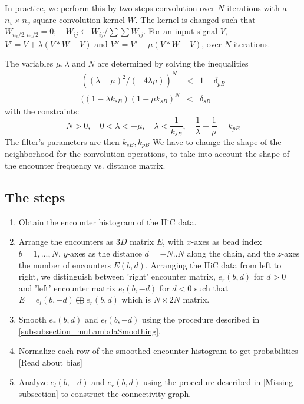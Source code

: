 \documentclass[12pt]{article}
\begin{document}
In practice, we perform this by two steps convolution over $N$ iterations with a $n_v\times n_v$ square convolution kernel $W$. The kernel is changed such that $W_{n_v/2,n_v/2} =0; \quad W_{ij}\leftarrow W_{ij}/\sum\sum W_{ij}$. For an input signal $V$, $V' = V+\lambda (V*W-V)$
and $V''= V'+\mu (V*W-V)$, over $N$ iterations. 

The variables $\mu,\lambda$ and $N$ are determined by solving the inequalities 
\begin{eqnarray*}
((\lambda-\mu)^2 /(-4\lambda\mu))^N &<& 1+\delta_{pB}\\
((1-\lambda k_{sB})(1-\mu k_{sB})^N &<& \delta_{sB}
\end{eqnarray*}
with the constraints:
\begin{equation*}
N>0,\quad 0<\lambda<-\mu,\quad \lambda<\frac{1}{k_{sB}},\quad \frac{1}{\lambda}+\frac{1}{\mu}=k_{pB}
\end{equation*} 
The filter's parameters are then $k_{sB}, k_{pB}$
We have to change the shape of the neighborhood for the convolution operations, to take into account the shape of the encounter frequency vs. distance matrix. 

\subsection{The steps}

\begin{enumerate}
\item Obtain the encounter histogram of the HiC data.
\item Arrange the encounters as $3D$ matrix $E$, with $x$-axes as bead index $b=1,...,N$, $y$-axes as the distance $d=-N..N$ along the chain, and the $z$-axes the number of encounters $E(b,d)$. Arranging the HiC data from left to right, we distinguish between 'right' encounter matrix, $e_r(b,d)$ for $d>0$ and 'left' encounter matrix $e_l(b,-d)$ for $d<0$ such that $E=e_l(b,-d)\bigoplus e_r(b,d)$ which is  $N\times 2N$ matrix. 
\item Smooth $e_r(b,d)$ and $e_l(b,-d)$ using the procedure described in \ref{subsubsection_muLambdaSmoothing}.
\item Normalize each row of the smoothed encounter histogram to get probabilities [Read about bias]
\item Analyze $e_l(b,-d)$ and $e_r(b,d)$ using the procedure described in [Missing subsection] to construct the connectivity graph.
\end{enumerate}




\end{document}
